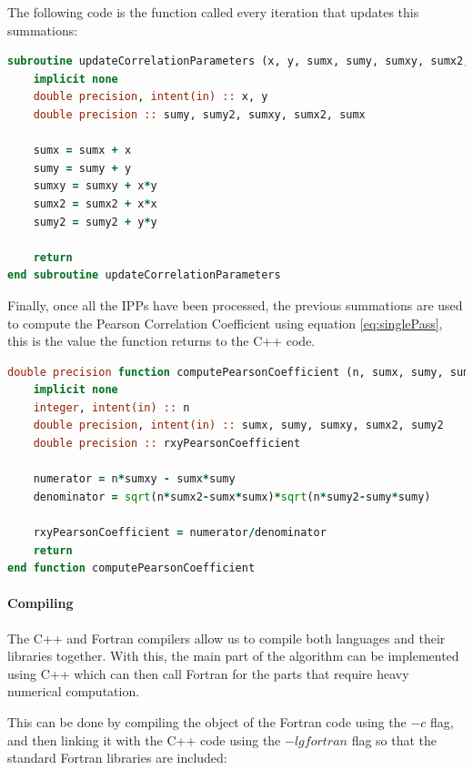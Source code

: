 The following code is the function called every iteration that updates this summations:

\begin{minipage}{\linewidth}
\begin{lstlisting}[language=Fortran, caption=Updating the summations]
subroutine updateCorrelationParameters (x, y, sumx, sumy, sumxy, sumx2, sumy2)
	implicit none
	double precision, intent(in) :: x, y
	double precision :: sumy, sumy2, sumxy, sumx2, sumx

	sumx = sumx + x
	sumy = sumy + y
	sumxy = sumxy + x*y
	sumx2 = sumx2 + x*x
	sumy2 = sumy2 + y*y

	return
end subroutine updateCorrelationParameters
\end{lstlisting}
\end{minipage}

Finally, once all the IPPs have been processed, the previous summations are used to compute the Pearson Correlation Coefficient using equation \ref{eq:singlePass}, this is the value the function returns to the C++ code.

\begin{minipage}{\linewidth}
\begin{lstlisting}[language=Fortran, caption=Computing the correlation coefficient using the summations]
double precision function computePearsonCoefficient (n, sumx, sumy, sumxy, sumx2, sumy2)
	implicit none
	integer, intent(in) :: n
	double precision, intent(in) :: sumx, sumy, sumxy, sumx2, sumy2 
	double precision :: rxyPearsonCoefficient

	numerator = n*sumxy - sumx*sumy
	denominator = sqrt(n*sumx2-sumx*sumx)*sqrt(n*sumy2-sumy*sumy)

	rxyPearsonCoefficient = numerator/denominator
	return
end function computePearsonCoefficient
\end{lstlisting}
\end{minipage}

\paragraph{Compiling}

The C++ and Fortran compilers allow us to compile both languages and their libraries together. With this, the main part of the algorithm can be implemented using C++ which can then call Fortran for the parts that require heavy numerical computation.

This can be done by compiling the object of the Fortran code using the $-c$ flag, and then linking it with the C++ code using the $-lgfortran$ flag so that the standard Fortran libraries are included: \\

